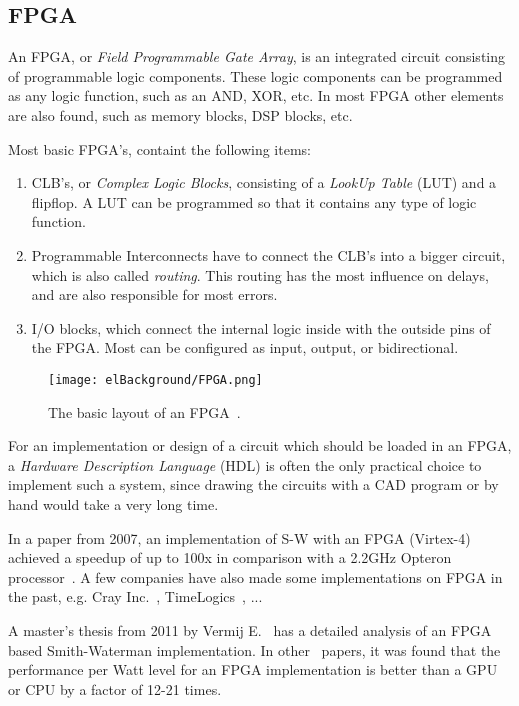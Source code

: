 \subsection{FPGA}

An FPGA, or \emph{Field Programmable Gate Array}, is an integrated circuit consisting of programmable logic components. These logic components can be programmed as any logic function, such as an AND, XOR, etc. In most FPGA other elements are also found, such as memory blocks, DSP blocks, etc.

Most basic FPGA's, containt the following items:
\begin{enumerate}
	\item CLB's, or \emph{Complex Logic Blocks}, consisting of a \emph{LookUp Table} (LUT) and a flipflop. A LUT can be programmed so that it contains any type of logic function.
	\item Programmable Interconnects have to connect the CLB's into a bigger circuit, which is also called \emph{routing}. This routing has the most influence on delays, and are also responsible for most errors.
	\item I/O blocks, which connect the internal logic inside with the outside pins of the FPGA. Most can be configured as input, output, or bidirectional.
\end{enumerate}

\begin{figure}[H]
	\centering
	\texttt{[image: elBackground/FPGA.png]}
	\caption{The basic layout of an FPGA~\cite{fpgaworkings}.}
	\label{fig:fpga}
\end{figure}

For an implementation or design of a circuit which should be loaded in an FPGA, a \emph{Hardware Description Language} (HDL) is often the only practical choice to implement such a system, since drawing the circuits with a CAD program or by hand would take a very long time.

In a paper from 2007, an implementation of S-W with an FPGA (Virtex-4) achieved a speedup of up to 100x in comparison with a 2.2GHz Opteron processor~\cite{fpga100x}.%
A few companies have also made some implementations on FPGA in the past, e.g. Cray Inc.~\cite{Cray}, TimeLogics~\cite{Timelogics}, ...

A master's thesis from 2011 by Vermij E.~\cite{Vermij} %
 has a detailed analysis of an FPGA based Smith-Waterman implementation. In other~\cite{FPGAeff} papers, it was found that the performance per Watt level for an FPGA implementation is better than a GPU or CPU by a factor of 12-21 times.

